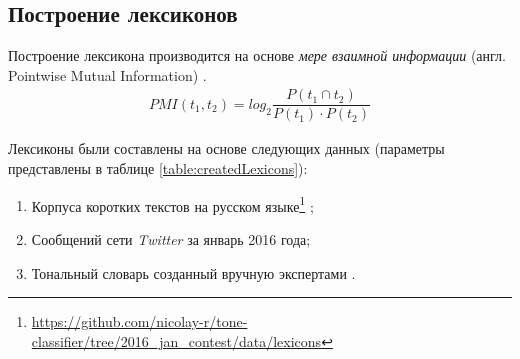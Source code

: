 \subsection{Построение лексиконов}

Построение лексикона производится на основе {\it мере взаимной информации}
(англ. Pointwise Mutual Information) \cite{lexiconSO}.
\begin{gather}
    PMI(t_1, t_2) = log_2 \dfrac{P(t_1\cap t_2)}{P(t_1)\cdot P(t_2)}
\end{gather}

Лексиконы были составлены на основе следующих данных (параметры представлены
в таблице \ref{table:createdLexicons}):

\begin{enumerate}
    \item Корпуса коротких текстов на русском языке\footnote{
        \url{https://github.com/nicolay-r/tone-classifier/tree/2016_jan_contest/data/lexicons}
    } \cite{rubtsovaCollection};
    \item Сообщений сети {\it Twitter } за январь 2016 года;
    \item Тональный словарь созданный вручную экспертами \cite{expertLexicon}.
\end{enumerate}


